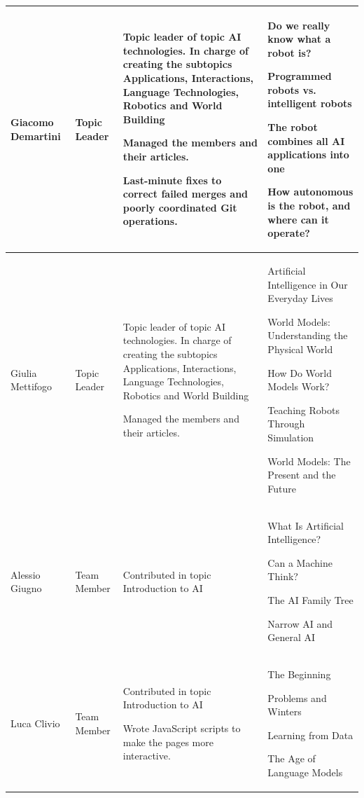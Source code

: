 \documentclass[11pt]{article}
\begin{document}
\begin{longtable} [c] {|p{3cm}|l|p{7cm}|p{4cm}|}
	Giacomo Demartini & Topic Leader & 
	\par \textbullet{} Topic leader of topic AI technologies. In charge of creating the subtopics Applications, Interactions, Language Technologies, Robotics and World Building
	\par \textbullet{} Managed the members and their articles.
	\par \textbullet{}  Last-minute fixes to correct failed merges and poorly coordinated Git operations.&
	\par \textbullet{} Do we really know what a robot is?
	\par \textbullet{} Programmed robots vs. intelligent robots
	\par \textbullet{} The robot combines all AI applications into one
	\par \textbullet{} How autonomous is the robot, and where can it operate? \\ 
	\hline
	
	Giulia Mettifogo & Topic Leader & 
	\par \textbullet{} Topic leader of topic AI technologies. In charge of creating the subtopics Applications, Interactions, Language Technologies, Robotics and World Building
	\par \textbullet{} Managed the members and their articles. &
	\par \textbullet{} Artificial Intelligence in Our Everyday Lives
	\par \textbullet{} World Models: Understanding the Physical World
	\par \textbullet{} How Do World Models Work?
	\par \textbullet{} Teaching Robots Through Simulation 
	\par \textbullet{} World Models: The Present and the Future \\ 
	\hline
	
	Alessio Giugno & Team Member &
	\par \textbullet{} Contributed in topic Introduction to AI &
	\par \textbullet{} What Is Artificial Intelligence?
	\par \textbullet{} Can a Machine Think?
	\par \textbullet{} The AI Family Tree
	\par \textbullet{} Narrow AI and General AI\\ 
	\hline
	
	Luca Clivio & Team Member &
	\par \textbullet{} Contributed in topic Introduction to AI
	\par \textbullet{} Wrote JavaScript scripts to make the pages more interactive. &
	\par \textbullet{} The Beginning
	\par \textbullet{} Problems and Winters
	\par \textbullet{} Learning from Data
	\par \textbullet{} The Age of Language Models \\ 
	\hline
	

\end{longtable}
\end{document}
